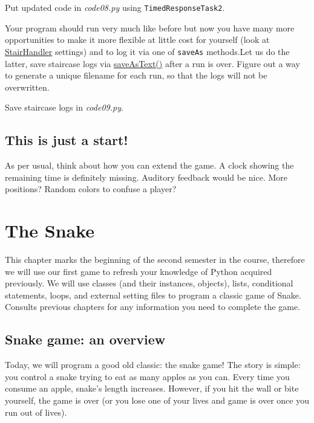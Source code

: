 \documentclass[
]{book}
\begin{document}
Put updated code in \emph{code08.py} using \texttt{TimedResponseTask2}.

Your program should run very much like before but now you have many more opportunities to make it more flexible at little cost for yourself (look at \href{https://psychopy.org/api/data.html\#stairhandler}{StairHandler} settings) and to log it via one of \texttt{saveAs} methods.Let us do the latter, save staircase logs via \href{https://psychopy.org/api/data.html\#psychopy.data.StairHandler.saveAsText}{saveAsText()} after a run is over. Figure out a way to generate a unique filename for each run, so that the logs will not be overwritten.

Save staircase logs in \emph{code09.py}.

\hypertarget{this-is-just-a-start}{%
\section{This is just a start!}\label{this-is-just-a-start}}

As per usual, think about how you can extend the game. A clock showing the remaining time is definitely missing. Auditory feedback would be nice. More positions? Random colors to confuse a player?

\hypertarget{the-snake}{%
\chapter{The Snake}\label{the-snake}}

This chapter marks the beginning of the second semester in the course, therefore we will use our first game to refresh your knowledge of Python acquired previously. We will use classes (and their instances, objects), lists, conditional statements, loops, and external setting files to program a classic game of Snake. Consults previous chapters for any information you need to complete the game.

\hypertarget{snake-game-an-overview}{%
\section{Snake game: an overview}\label{snake-game-an-overview}}

Today, we will program a good old classic: the snake game! The story is simple: you control a snake trying to eat as many apples as you can. Every time you consume an apple, snake's length increases. However, if you hit the wall or bite yourself, the game is over (or you lose one of your lives and game is over once you run out of lives).
\end{document}
